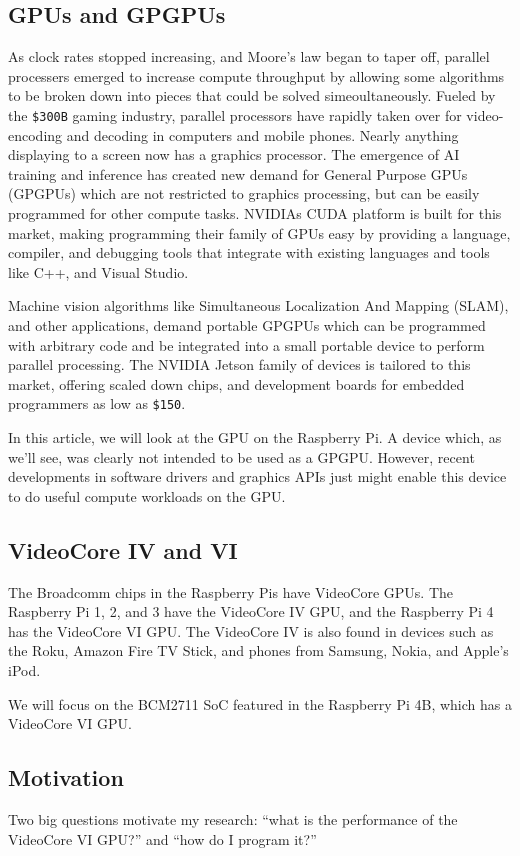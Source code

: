 \documentclass[12pt]{article}
\begin{document}
\subsection{GPUs and GPGPUs}
As clock rates stopped increasing, and Moore's law began to taper off, parallel processers emerged to increase compute throughput by allowing some algorithms to be broken down into pieces that could be solved simeoultaneously. Fueled by the \verb|$300B| gaming industry, parallel processors have rapidly taken over for video-encoding and decoding in computers and mobile phones. Nearly anything displaying to a screen now has a graphics processor. The emergence of AI training and inference has created new demand for General Purpose GPUs (GPGPUs) which are not restricted to graphics processing, but can be easily programmed for other compute tasks. NVIDIAs CUDA platform is built for this market, making programming their family of GPUs easy by providing a language, compiler, and debugging tools that integrate with existing languages and tools like C++, and Visual Studio.

Machine vision algorithms like Simultaneous Localization And Mapping (SLAM), and other applications, demand portable GPGPUs which can be programmed with arbitrary code and be integrated into a small portable device to perform parallel processing. The NVIDIA Jetson family of devices is tailored to this market, offering scaled down chips, and development boards for embedded programmers as low as \verb|$150|.

In this article, we will look at the GPU on the Raspberry Pi. A device which, as we'll see, was clearly not intended to be used as a GPGPU. However, recent developments in software drivers and graphics APIs just might enable this device to do useful compute workloads on the GPU. 

\subsection{VideoCore IV and VI}
The Broadcomm chips in the Raspberry Pis have VideoCore GPUs. The Raspberry Pi 1, 2, and 3 have the VideoCore IV GPU, and the Raspberry Pi 4 has the VideoCore VI GPU. The VideoCore IV is also found in devices such as the Roku, Amazon Fire TV Stick, and phones from Samsung, Nokia, and Apple's iPod. 

We will focus on the BCM2711 SoC featured in the Raspberry Pi 4B, which has a VideoCore VI GPU. 

\subsection{Motivation}
Two big questions motivate my research: ``what is the performance of the VideoCore VI GPU?'' and ``how do I program it?''
\end{document}
